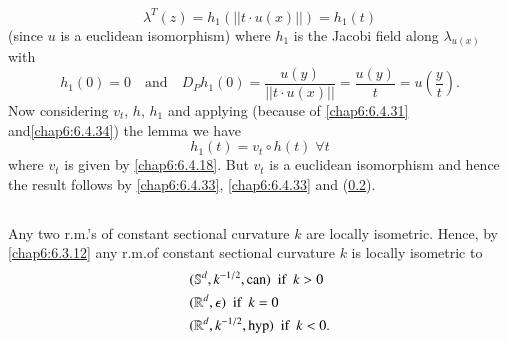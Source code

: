 \begin{equation*}
\lambda^{T}(z)=h_{1}(||t\cdot u(x)||)=h_{1}(t)\tag{6.4.33}\label{chap6:6.4.33}
\end{equation*}
(since $u$ is a euclidean isomorphism) where $h_{1}$ is the Jacobi
field along $\lambda_{u(x)}$ with
\begin{equation*}
h_{1}(0)=0\quad\text{and}\quad D_{P}h_{1}(0)=\frac{u(y)}{||t\cdot
  u(x)||}=\frac{u(y)}{t}=u\left(\frac{y}{t}\right).\tag{6.4.34}\label{chap6:6.4.34} 
\end{equation*}
Now considering $v_{t}$, $h$, $h_{1}$ and applying (because of
\eqref{chap6:6.4.31} and\break \eqref{chap6:6.4.34}) the lemma we have
\begin{equation*}
h_{1}(t)=v_{t}\circ h(t) \; \forall t\tag{6.4.35}\label{chap6:6.4.35}
\end{equation*}
where $v_{t}$ is given by \eqref{chap6:6.4.18}. But $v_{t}$ is a euclidean
isomorphism and hence the result follows by \eqref{chap6:6.4.33},
\eqref{chap6:6.4.33} and (\ref{chap6:6.4.36}).

\setcounter{subsection}{34}

\subsection{}\label{chap6:s6.4.35}

\begin{coro*}
Any two r.m.'s of constant sectional curvature $k$ are locally
isometric. Hence, by \eqref{chap6:6.3.12} any r.m.\@ of constant sectional
curvature $k$ is locally isometric to
\begin{align*}
&(\mathbb{S}^{d},k^{-1/2},\operatorname{can})\text{ \ if \ } k>0\\
& (\mathbb{R}^{d},\epsilon)\text{ \ if \ } k=0\\
& (\mathbb{R}^{d},k^{-1/2},\operatorname{hyp})\text{ \ if \ }k<0.
\end{align*}
\end{coro*}

\subsection{}\label{chap6:6.4.36}


